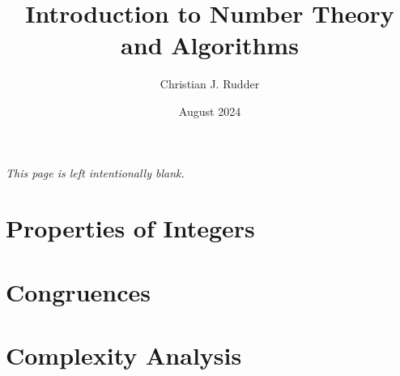 \documentclass{memoir}
\title{Introduction to Number Theory and Algorithms}
\author{Christian J. Rudder}
\date{August 2024}
\begin{document}
\maketitle
\setcounter{tocdepth}{2}

\tableofcontents

\newpage
\thispagestyle{empty}
\mbox{}
\vfill
\begin{center}
    \textit{This page is left intentionally blank.}
\end{center}
\vfill
\newpage




\chapter{Properties of Integers}





\chapter{Congruences}








\chapter{Complexity Analysis}



\end{document}
